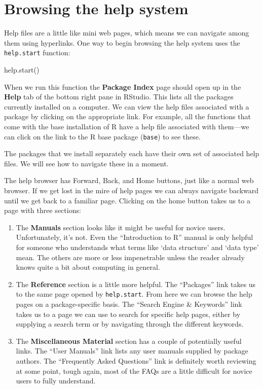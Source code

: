 \documentclass[
]{book}
\newenvironment{Shaded}{\begin{snugshade}}{\end{snugshade}}
\newcommand{\FunctionTok}[1]{\textcolor[rgb]{0.00,0.00,0.00}{#1}}
\newcommand{\NormalTok}[1]{#1}
\begin{document}
\hypertarget{browsing-the-help-system}{%
\section{Browsing the help system}\label{browsing-the-help-system}}

Help files are a little like mini web pages, which means we can navigate among them using hyperlinks. One way to begin browsing the help system uses the \texttt{help.start} function:

\begin{Shaded}
\begin{Highlighting}[]
\FunctionTok{help.start}\NormalTok{() }
\end{Highlighting}
\end{Shaded}

When we run this function the \textbf{Package Index} page should open up in the \textbf{Help} tab of the bottom right pane in RStudio. This lists all the packages currently installed on a computer. We can view the help files associated with a package by clicking on the appropriate link. For example, all the functions that come with the base installation of R have a help file associated with them---we can click on the link to the R base package (\texttt{base}) to see these.

The packages that we install separately each have their own set of associated help files. We will see how to navigate these in a moment.

The help browser has Forward, Back, and Home buttons, just like a normal web browser. If we get lost in the mire of help pages we can always navigate backward until we get back to a familiar page. Clicking on the home button takes us to a page with three sections:

\begin{enumerate}
\def\labelenumi{\arabic{enumi}.}
\item
  The \textbf{Manuals} section looks like it might be useful for novice users. Unfortunately, it's not. Even the ``Introduction to R'' manual is only helpful for someone who understands what terms like `data structure' and `data type' mean. The others are more or less impenetrable unless the reader already knows quite a bit about computing in general.
\item
  The \textbf{Reference} section is a little more helpful. The ``Packages'' link takes us to the same page opened by \texttt{help.start}. From here we can browse the help pages on a package-specific basis. The ``Search Engine \& Keywords'' link takes us to a page we can use to search for specific help pages, either by supplying a search term or by navigating through the different keywords.
\item
  The \textbf{Miscellaneous Material} section has a couple of potentially useful links. The ``User Manuals'' link lists any user manuals supplied by package authors. The ``Frequently Asked Questions'' link is definitely worth reviewing at some point, tough again, most of the FAQs are a little difficult for novice users to fully understand.
\end{enumerate}
\end{document}
